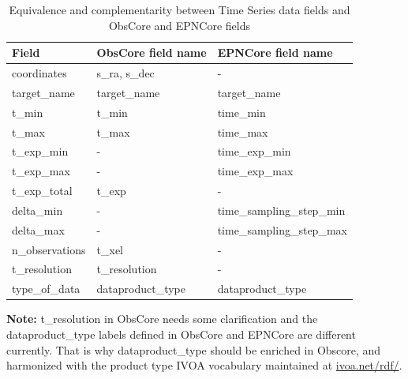 \documentclass[11pt,a4paper]{ivoa}
\begin{document}
\begin{table}[!htb]  
  \begin{center}
  \begin{small}
  \caption{Equivalence and complementarity between Time Series data fields and ObsCore and EPNCore fields}
   \label{tab:obs_epn}
  \begin{tabular}{|l|l|l|}
\hline
    \textbf{Field}      & \textbf{ObsCore field name} & \textbf{EPNCore field name}  \\%
\hline
    coordinates     & s\_ra, s\_dec          & -                         \\
    \hline
    target\_name    & target\_name           & target\_name              \\
    \hline
    t\_min          & t\_min                 & time\_min                 \\
    \hline
    t\_max          & t\_max                 & time\_max                 \\
    \hline
    t\_exp\_min     &  -                     & time\_exp\_min            \\
    \hline
    t\_exp\_max     &  -                     & time\_exp\_max            \\
    \hline
    t\_exp\_total   &  t\_exp                & -                         \\
    \hline
    delta\_min      &  -                     & time\_sampling\_step\_min \\
    \hline
    delta\_max      &  -                     & time\_sampling\_step\_max \\
    \hline
    n\_observations & t\_xel                 & -                         \\
    \hline
     t\_resolution   & t\_resolution      & -                         \\
    type\_of\_data  & dataproduct\_type & dataproduct\_type         \\
\hline
  \end{tabular}
  \end{small}

  \end{center}
 \end{table} 
 
\textbf{ Note:}  t\_resolution in ObsCore needs some clarification and the dataproduct\_type labels defined in ObsCore and EPNCore are different currently. 
That is why dataproduct\_type should be enriched in Obscore, and harmonized with the product type IVOA vocabulary maintained at \url{ivoa.net/rdf/}.
\end{document}
